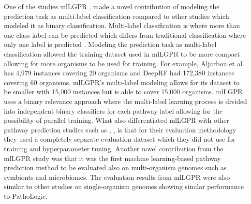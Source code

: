 \documentclass[sn-mathphys,Numbered]{sn-jnl}%
\theoremstyle{thmstyleone}%
\theoremstyle{thmstyletwo}%
\theoremstyle{thmstylethree}%
\begin{document}
One of the studies mlLGPR \cite{m.a.basherMetabolicPathwayInference2020}, made a novel contribution of modeling the prediction task as multi-label classification compared to other studies which modeled it as binary classification.
Multi-label classification is where more than one class label can be predicted which differs from traditional classification where only one label is predicted \cite{tsoumakasMultiLabelClassificationOverview2007}.
Modeling the prediction task as multi-label classification allowed the training dataset used in mlLGPR to be more compact allowing for more organisms to be used for training.
For example, Aljarbou et al. \cite{aljarbouDeterminingPresenceMetabolic2020} has 4,979 instances covering 20 organisms and DeepRF \cite{shahDeepRFDeepLearning2022} had 172,380 instances covering 60 organisms.
mlLGPR's multi-label modeling allows for its dataset to be smaller with 15,000 instances but is able to cover 15,000 organisms.
mlLGPR uses a binary relevance approach \cite{zhangBinaryRelevanceMultilabel2018} where the multi-label learning process is divided into independent binary classifiers for each pathway label allowing for the possibility of parallel training.
What also differentiated mlLGPR with other pathway prediction studies such as \cite{daleMachineLearningMethods2010}, \cite{aljarbouDeterminingPresenceMetabolic2020}, \cite{shahDeepRFDeepLearning2022} is that for their evaluation methodology they used a completely separate evaluation dataset which they did not use for training and hyperparameter tuning.
Another novel contribution from the mlLGPR study was that it was the first machine learning-based pathway prediction method to be evaluated also on multi-organism genomes such as symbionts and microbiomes.
The evaluation results from mlLGPR were also similar to other studies on single-organism genomes showing similar performance to PathoLogic.
\end{document}
